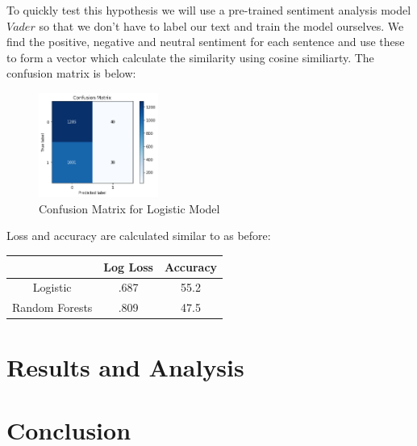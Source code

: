 \documentclass[11pt,a4paper]{article}
\begin{document}
To quickly test this hypothesis we will use a pre-trained sentiment analysis model $Vader$ so that we don't have to label our text and train the model ourselves.  We find the positive, negative and neutral sentiment for each sentence and use these to form a vector which calculate the similarity using cosine similiarty.  The confusion matrix is below:
\begin{figure}[H]
    \centering
    \includegraphics[width=0.35\textwidth]{sentiment_lr}
    \caption{\label{font-table} Confusion Matrix for Logistic Model }
\end{figure} 


Loss and accuracy are calculated similar to as before:

\begin{table}[H]
\begin{center}
\begin{tabular}{|c|c|c|}
\hline \bf & \bf Log Loss & \bf Accuracy \\ \hline
Logistic & .687 & 55.2 \\
Random Forests & .809 & 47.5 \\
\hline
\end{tabular}
\end{center}
\end{table}

\section{Results and Analysis}
\section{Conclusion}


%
%


\end{document}
